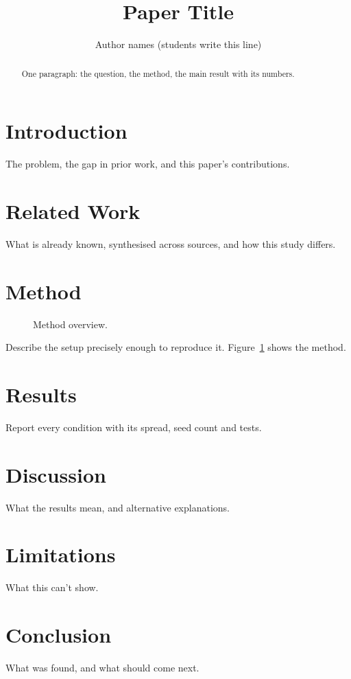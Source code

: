 \documentclass[10pt,twocolumn]{article}
\title{Paper Title}
\author{Author names (students write this line)}
\date{}
\begin{document}
\maketitle

\begin{abstract}
One paragraph: the question, the method, the main result with its numbers.
\end{abstract}

\section{Introduction}
The problem, the gap in prior work, and this paper's contributions.

\section{Related Work}
What is already known, synthesised across sources, and how this study differs.

\section{Method}
\begin{figure}[t]
  \centering
  
  \caption{Method overview.}
  \label{fig:method}
\end{figure}
Describe the setup precisely enough to reproduce it. Figure~\ref{fig:method} shows the method.

\section{Results}
Report every condition with its spread, seed count and tests.

\section{Discussion}
What the results mean, and alternative explanations.

\section{Limitations}
What this can't show.

\section{Conclusion}
What was found, and what should come next.

\nocite{example}


\end{document}
